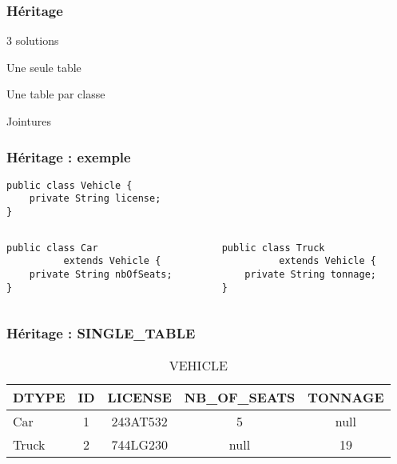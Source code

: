 \documentclass[t,12pt]{beamer}
\begin{document}
\begin{frame}
	\frametitle{H\'eritage}

	\begin{block}{3 solutions}
		\begin{description}
			\item<2->[SINGLE\_TABLE :] Une seule table
			\item<3->[TABLE\_PER\_CLASS :] Une table par classe
			\item<4->[JOINED :] Jointures
		\end{description}
	\end{block}
	\pause
\end{frame}

\begin{frame}[fragile]
	\frametitle{H\'eritage : exemple}

	\begin{lstlisting}
public class Vehicle {
    private String license;
}
	\end{lstlisting}

	\begin{columns}
		\begin{column}{0.5\textwidth}
			\begin{lstlisting}
public class Car
          extends Vehicle {
    private String nbOfSeats;
}
			\end{lstlisting}
		\end{column}
		\vrule{}
		\begin{column}{0.5\textwidth}
			\begin{lstlisting}
public class Truck
          extends Vehicle {
    private String tonnage;
}
			\end{lstlisting}
		\end{column}
	\end{columns}
\end{frame}

\begin{frame}
	\frametitle{H\'eritage : SINGLE\_TABLE}

	\begin{table}
		\caption{VEHICLE}
		\begin{tabular}{l | c | c | c | c}
			DTYPE & ID & LICENSE & NB\_OF\_SEATS & TONNAGE \\
			\hline
			Car & 1 & 243AT532 & 5 & null \\
			Truck & 2 & 744LG230 & null & 19
		\end{tabular}
	\end{table}
\end{frame}
\end{document}
